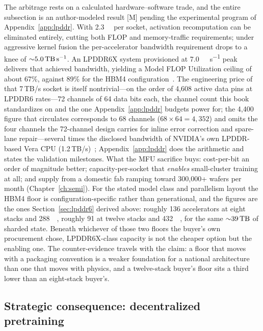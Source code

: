 The arbitrage rests on a calculated hardware--software trade, and the entire subsection is an author-modeled result [M] pending the experimental program of Appendix~\ref{app:lpddr}. With \SI{2.3}{\tera\byte} per socket, activation recomputation can be eliminated entirely, cutting both FLOP and memory-traffic requirements; under aggressive kernel fusion the per-accelerator bandwidth requirement drops to a knee of ${\sim}\SI{5.0}{\tera\byte\per\second}$. An LPDDR6X system provisioned at \SI{7.0}{\tera\byte\per\second} peak delivers that achieved bandwidth, yielding a Model FLOP Utilization ceiling of about 67\%, against 89\% for the HBM4 configuration~\cite{riken-study}. The engineering price of that 7\,TB/s socket is itself nontrivial---on the order of 4,608 active data pins at LPDDR6 rates---72 channels of 64 data bits each, the channel count this book standardizes on and the one Appendix~\ref{app:lpddr} budgets power for; the 4,400 figure that circulates corresponds to 68 channels ($68\times64=4{,}352$) and omits the four channels the 72-channel design carries for inline error correction and spare-lane repair---several times the disclosed bandwidth of NVIDIA's own LPDDR-based Vera CPU (1.2\,TB/s)~\cite{vera-cpu}; Appendix~\ref{app:lpddr} does the arithmetic and states the validation milestones. What the MFU sacrifice buys: cost-per-bit an order of magnitude better; capacity-per-socket that \emph{enables} small-cluster training at all; and supply from a domestic fab ramping toward 300,000+ wafers per month (Chapter~\ref{ch:semi}). For the stated model class and parallelism layout the HBM4 floor is configuration-specific rather than generational, and the figures are the ones Section~\ref{sec:lpddr6} derived above: roughly 136 accelerators at eight stacks and \SI{288}{\giga\byte}, roughly 91 at twelve stacks and \SI{432}{\giga\byte}, for the same ${\sim}\SI{39}{\tera\byte}$ of sharded state. Beneath whichever of those two floors the buyer's own procurement chose, LPDDR6X-class capacity is not the cheaper option but the enabling one. The counter-evidence travels with the claim: a floor that moves with a packaging convention is a weaker foundation for a national architecture than one that moves with physics, and a twelve-stack buyer's floor sits a third lower than an eight-stack buyer's.



\subsection{Strategic consequence: decentralized pretraining}

